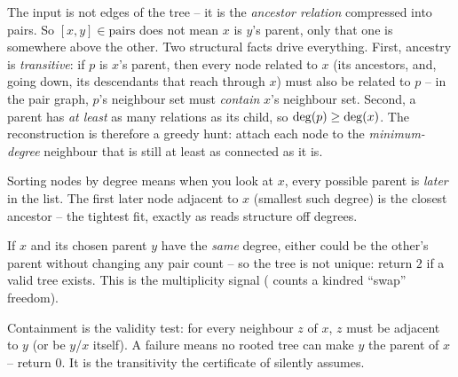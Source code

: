 The input is not edges of the tree -- it is the \emph{ancestor relation} compressed into pairs. So
$[x,y]\in\text{pairs}$ does not mean $x$ is $y$'s parent, only that one is somewhere above the
other. Two structural facts drive everything. First, ancestry is \emph{transitive}: if $p$ is
$x$'s parent, then every node related to $x$ (its ancestors, and, going down, its descendants that
reach through $x$) must also be related to $p$ -- in the pair graph, $p$'s neighbour set must
\emph{contain} $x$'s neighbour set. Second, a parent has \emph{at least} as many relations as its
child, so $\operatorname{deg}(p)\ge\operatorname{deg}(x)$. The reconstruction is therefore a greedy hunt: attach each node
to the \emph{minimum-degree} neighbour that is still at least as connected as it is.

\begin{observation}
Sorting nodes by degree means when you look at $x$, every possible parent is \emph{later} in the
list. The first later node adjacent to $x$ (smallest such degree) is the closest ancestor -- the
tightest fit, exactly as  reads structure off degrees.
\end{observation}
\begin{observation}
If $x$ and its chosen parent $y$ have the \emph{same} degree, either could be the other's parent
without changing any pair count -- so the tree is not unique: return $2$ if a valid tree exists.
This is the multiplicity signal ( counts a kindred ``swap'' freedom).
\end{observation}
\begin{observation}
Containment is the validity test: for every neighbour $z$ of $x$, $z$ must be adjacent to $y$ (or be
$y$/$x$ itself). A failure means no rooted tree can make $y$ the parent of $x$ -- return $0$. It is
the transitivity the certificate of  silently assumes.
\end{observation}

\begin{thinkbox}
\end{thinkbox}

